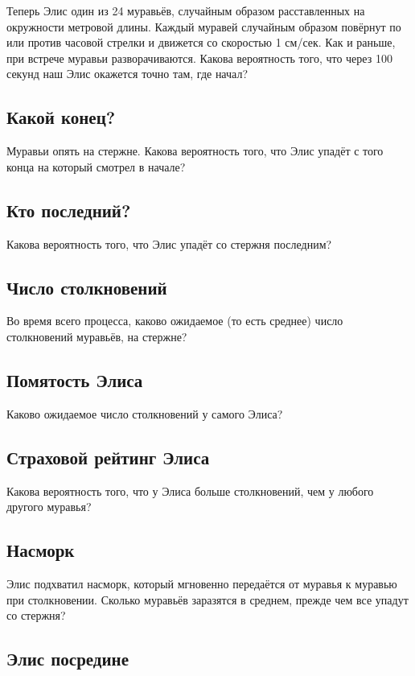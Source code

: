 Теперь Элис один из 24 муравьёв, случайным образом расставленных на окружности метровой длины.
Каждый муравей случайным образом повёрнут по или против часовой стрелки и движется со скоростью 1 см/сек.
Как и раньше, при встрече муравьи разворачиваются.
Какова вероятность того, что через 100 секунд наш Элис окажется точно там, где начал?

\subsection*{Какой конец?}

Муравьи опять на стержне.
Какова вероятность того, что Элис упадёт с того конца на который смотрел в начале?

\subsection*{Кто последний?}

Какова вероятность того, что Элис упадёт со стержня последним?

\subsection*{Число столкновений}

Во время всего процесса, каково ожидаемое (то есть среднее) число столкновений муравьёв, на стержне?

\subsection*{Помятость Элиса}

Каково ожидаемое число столкновений у самого Элиса?

\subsection*{Страховой рейтинг Элиса}

Какова вероятность того, что у Элиса больше столкновений, чем у любого другого муравья?

\subsection*{Насморк}

Элис подхватил насморк, который мгновенно передаётся от муравья к муравью при столкновении.
Сколько муравьёв заразятся в среднем, прежде чем все упадут со стержня?

\subsection*{Элис посредине}

